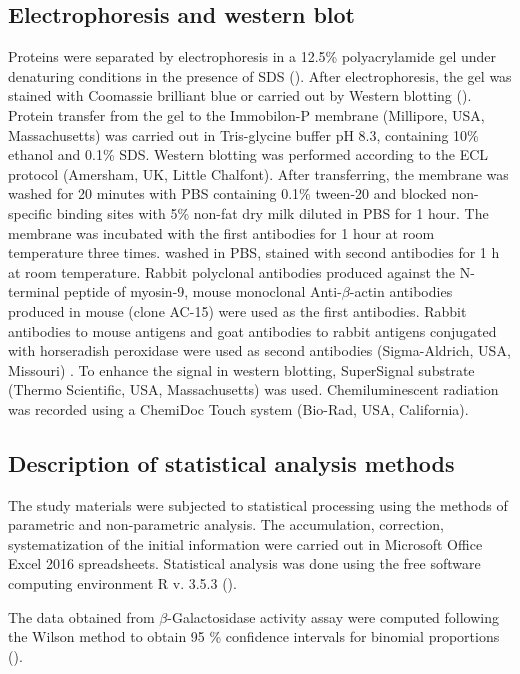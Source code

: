 \documentclass[alpha-refs]{wiley-article}
\begin{document}
\subsection{Electrophoresis and western blot}

Proteins were separated by electrophoresis in a 12.5\%  polyacrylamide gel under denaturing conditions in the presence of SDS (\cite{laemmli1970cleavage}).
After electrophoresis, the gel was stained with Coomassie brilliant blue or carried out by Western blotting (\cite{towbin1979electrophoretic}).
Protein transfer from the gel to the Immobilon-P membrane (Millipore, USA, Massachusetts) was carried out in Tris-glycine buffer pH 8.3, containing 10\% ethanol and 0.1\% SDS.
Western blotting was performed according to the ECL protocol (Amersham, UK, Little Chalfont).
After transferring, the membrane was washed for 20 minutes with PBS containing 0.1\% tween-20 and blocked non-specific binding sites with 5\% non-fat dry milk diluted in PBS for 1 hour.
The membrane was incubated with the first antibodies for 1 hour at room temperature three times. washed in PBS, stained with second antibodies for 1 h at room temperature.
Rabbit polyclonal antibodies produced against the N-terminal peptide of myosin-9, mouse monoclonal Anti-$\beta$-actin antibodies produced in mouse (clone AC-15) were used as the first antibodies.
Rabbit antibodies to mouse antigens and goat antibodies to rabbit antigens conjugated with horseradish peroxidase were used as second antibodies (Sigma-Aldrich, USA, Missouri) .
To enhance the signal in western blotting, SuperSignal substrate (Thermo Scientific, USA, Massachusetts) was used.
Chemiluminescent radiation was recorded using a ChemiDoc Touch system (Bio-Rad, USA, California).

\subsection{Description of statistical analysis methods}

The study materials were subjected to statistical processing using the methods of parametric and non-parametric analysis.
The accumulation, correction, systematization of the initial information were carried out in Microsoft Office Excel 2016 spreadsheets.
Statistical analysis was done using the free software computing environment R v. 3.5.3 (\cite{team2014r}).

The data obtained from $\beta$-Galactosidase activity assay were computed following the Wilson method to obtain 95 \% confidence intervals for binomial proportions (\cite{wilson1927probable}).
\end{document}
